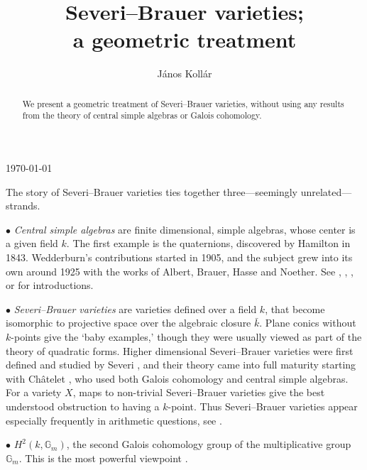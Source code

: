 \documentclass{amsart}
\theoremstyle{definition}
\theoremstyle{remark}
\newcommand{\gm}[0]{{\mathbb G}_m}
\begin{document}



\today





 \title[Severi--Brauer varieties]{Severi--Brauer varieties;\\ a geometric treatment}
 \author{J\'anos Koll\'ar}

 \begin{abstract} We present a geometric treatment of Severi--Brauer varieties, without using any results from the theory of central simple algebras or   Galois cohomology.
   
       \end{abstract}


 \maketitle

\tableofcontents


The story of Severi--Brauer varieties ties together three---seemingly unrelated---strands.

$\bullet$ {\it Central simple algebras}  are finite dimensional, simple algebras, whose center is a given field $k$. The first example is the quaternions, discovered by  Hamilton   in 1843.    Wedderburn's 
contributions started  in  1905, and the subject grew into its own  around 
1925 with the works of Albert, Brauer, Hasse and  Noether.
See  \cite[Chap.13]{vdW-book}, \cite[Chap.4]{MR571884},
\cite[Chap.XVII]{lang-alg}, \cite{MR2266528}
or \cite[Chap.073W]{stacks-project}
for introductions.

$\bullet$ {\it Severi--Brauer varieties} are varieties defined over a field $k$, that become isomorphic to projective space over the algebraic closure $\bar k$. Plane conics without $k$-points give the `baby examples,' though they were usually viewed as part of the theory of quadratic forms.
 Higher dimensional Severi--Brauer varieties
 were first defined and studied by Severi \cite{severi-SB}, and their theory came into full maturity starting with  Ch\^atelet  \cite{MR0014720}, who used both  Galois cohomology and central simple algebras. 
For a variety $X$, 
maps to non-trivial Severi--Brauer varieties give the best understood  obstruction to having a $k$-point. Thus  Severi--Brauer varieties appear  especially frequently in   arithmetic questions, see  \cite{MR4304038}.



$\bullet$  $H^2(k, \gm)$, the second Galois cohomology group of the multiplicative group $\gm$.   This is the most powerful viewpoint
\cite{MR2266528}.
\medskip
\end{document}
